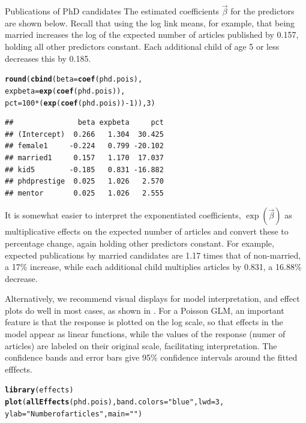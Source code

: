 \documentclass[11pt]{book}\usepackage[]{graphicx}\usepackage[]{color}
\makeatletter
\newcommand{\hlnum}[1]{\textcolor[rgb]{0.686,0.059,0.569}{#1}}%
\newcommand{\hlstr}[1]{\textcolor[rgb]{0.192,0.494,0.8}{#1}}%
\newcommand{\hlopt}[1]{\textcolor[rgb]{0,0,0}{#1}}%
\newcommand{\hlstd}[1]{\textcolor[rgb]{0.345,0.345,0.345}{#1}}%
\newcommand{\hlkwc}[1]{\textcolor[rgb]{0.333,0.667,0.333}{#1}}%
\newcommand{\hlkwd}[1]{\textcolor[rgb]{0.737,0.353,0.396}{\textbf{#1}}}%
\newenvironment{kframe}{%
 \def\at@end@of@kframe{}%
 \ifinner\ifhmode%
  \def\at@end@of@kframe{\end{minipage}}%
  \begin{minipage}{\columnwidth}%
 \fi\fi%
 \def\FrameCommand##1{\hskip\@totalleftmargin \hskip-\fboxsep
 \colorbox{shadecolor}{##1}\hskip-\fboxsep
     \hskip-\linewidth \hskip-\@totalleftmargin \hskip\columnwidth}%
 \MakeFramed {\advance\hsize-\width
   \@totalleftmargin\z@ \linewidth\hsize
   \@setminipage}}%
 {\par\unskip\endMakeFramed%
 \at@end@of@kframe}
\newenvironment{knitrout}{}{} %
\renewenvironment{knitrout}{\small\renewcommand{\baselinestretch}{.85}}{} %
\makeatother
\begin{document}
\begin{Example}[phdpubs1]{Publications of PhD candidates}
The estimated coefficients $\vec{\beta}$ for the predictors are shown below.
Recall that using the log link means, for example, that being married increases
the log of the expected number of
articles published by 0.157, holding all other predictors constant. 
Each additional child of age 5 or less decreases this by 0.185.
\begin{knitrout}
\color{fgcolor}\begin{kframe}
\begin{alltt}
\hlkwd{round}\hlstd{(}\hlkwd{cbind}\hlstd{(}\hlkwc{beta}\hlstd{=}\hlkwd{coef}\hlstd{(phd.pois),}
            \hlkwc{expbeta}\hlstd{=}\hlkwd{exp}\hlstd{(}\hlkwd{coef}\hlstd{(phd.pois)),}
            \hlkwc{pct}\hlstd{=}\hlnum{100}\hlopt{*}\hlstd{(}\hlkwd{exp}\hlstd{(}\hlkwd{coef}\hlstd{(phd.pois))}\hlopt{-}\hlnum{1}\hlstd{)),}\hlnum{3}\hlstd{)}
\end{alltt}
\begin{verbatim}
##               beta expbeta     pct
## (Intercept)  0.266   1.304  30.425
## female1     -0.224   0.799 -20.102
## married1     0.157   1.170  17.037
## kid5        -0.185   0.831 -16.882
## phdprestige  0.025   1.026   2.570
## mentor       0.025   1.026   2.555
\end{verbatim}
\end{kframe}
\end{knitrout}
\noindent It is somewhat easier to interpret the exponentiated coefficients, $\exp(\vec{\beta})$
as multiplicative effects on the expected number of articles and convert these to percentage
change, again holding other predictors constant.
For example, expected publications by married candidates are 1.17 times that of non-married,
a 17\% increase, while each additional child multiplies articles by 0.831, a 16.88\% decrease.

Alternatively, we recommend visual displays for model interpretation, and effect plots do well
in most cases, as shown in  .
For a Poisson GLM, an important feature is that the response is plotted on
the log scale, so that effects in the model appear as linear functions, while the
values of the response (numer of articles) are labeled on their original scale, facilitating
interpretation. The confidence bands and error bars give 95\% confidence intervals
around the fitted efffects.

\begin{knitrout}
\color{fgcolor}\begin{kframe}
\begin{alltt}
\hlkwd{library}\hlstd{(effects)}
\hlkwd{plot}\hlstd{(}\hlkwd{allEffects}\hlstd{(phd.pois),} \hlkwc{band.colors}\hlstd{=}\hlstr{"blue"}\hlstd{,} \hlkwc{lwd}\hlstd{=}\hlnum{3}\hlstd{,}
     \hlkwc{ylab}\hlstd{=}\hlstr{"Number of articles"}\hlstd{,} \hlkwc{main}\hlstd{=}\hlstr{""}\hlstd{)}
\end{alltt}
\end{kframe}\begin{figure}[!htbp]



\end{figure}
\end{knitrout}
\end{Example}
\end{document}
